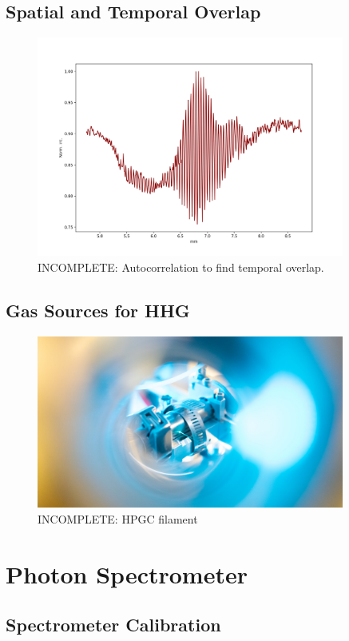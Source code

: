 \subsection{Spatial and Temporal Overlap}
\label{sec:temporal_overlap}

\begin{figure}
	\centering
	\includegraphics[width=0.9\textwidth]{figures/Beamline/Overlap_camera.png}
	\caption{INCOMPLETE: Autocorrelation to find temporal overlap.}
	\label{fig:fine_scan_temporal_overlap}
\end{figure}

\subsection{Gas Sources for HHG}
\label{sec:gas_source}
\begin{figure}
	\centering
	\includegraphics[width=0.9\textwidth]{figures/Beamline/high_pressure_cell_filament.jpg}
	\caption{INCOMPLETE: HPGC filament}
	\label{fig:HPGC_filament}
\end{figure}

\section{Photon Spectrometer}
\label{sec:photon_spec}


\subsection{Spectrometer Calibration}
\label{subsec:spec_calibration}